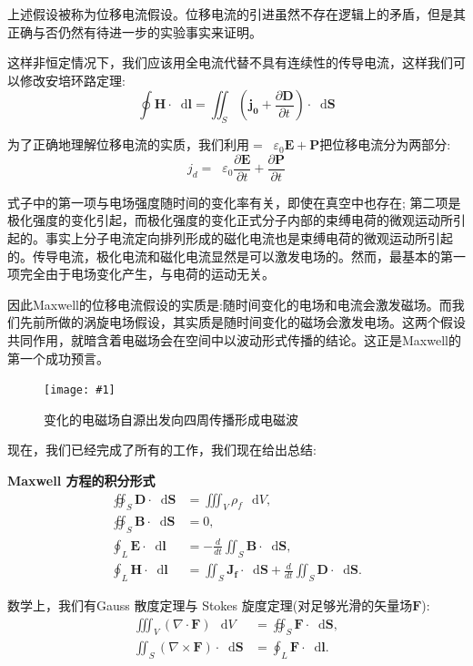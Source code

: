 \documentclass[12pt,a4paper,oneside]{report}
\theoremstyle{definition}
\theoremstyle{remark}
\newcommand{\insertfig}[3]{
    \begin{figure}[ht]
        \centering
        \texttt{[image: \#1]}
        \caption{#2}
        \label{fig:#1}
    \end{figure}
}
\newcommand{\mb}[1]{\mathbf{#1}}
\renewcommand{\d}{\mathop{}\!\mathrm{d}}
\renewcommand{\v}{\mathop{}\!\varepsilon}
\begin{document}
上述假设被称为位移电流假设。位移电流的引进虽然不存在逻辑上的矛盾，但是其正确与否仍然有待进一步的实验事实来证明。

这样非恒定情况下，我们应该用全电流代替不具有连续性的传导电流，这样我们可以修改安培环路定理:
\[
\oint \mb H \cdot \d \mb{l} = \iint_S (\mb{j_0}+\frac{\partial \mb{D}}{\partial t})\cdot \d \mb{S}
\]

为了正确地理解位移电流的实质，我们利用$\mb = \v_0 \mb{E} + \mb{P}$把位移电流分为两部分:
\[
j_d = \v_0 \frac{\partial \mb{E}}{\partial t}+\frac{\partial \mb{P}}{\partial t}
\]

式子中的第一项与电场强度随时间的变化率有关，即使在真空中也存在; 第二项是极化强度的变化引起，而极化强度的变化正式分子内部的束缚电荷的微观运动所引起的。事实上分子电流定向排列形成的磁化电流也是束缚电荷的微观运动所引起的。传导电流，极化电流和磁化电流显然是可以激发电场的。然而，最基本的第一项完全由于电场变化产生，与电荷的运动无关。

因此Maxwell的位移电流假设的实质是:随时间变化的电场和电流会激发磁场。而我们先前所做的涡旋电场假设，其实质是随时间变化的磁场会激发电场。这两个假设共同作用，就暗含着电磁场会在空间中以波动形式传播的结论。这正是Maxwell的第一个成功预言。

\insertfig{5-4.png}{变化的电磁场自源出发向四周传播形成电磁波}{0.25}

现在，我们已经完成了所有的工作，我们现在给出总结:

\textbf{Maxwell 方程的积分形式}
\begin{align*}
\oiint_{S} \mathbf{D}\cdot \d\mathbf{S} &= \iiint_{V} \rho_f\,\d V, \\[4pt]
\oiint_{S} \mathbf{B}\cdot \d\mathbf{S} &= 0, \\[4pt]
\oint_{L} \mathbf{E}\cdot \d\mathbf{l} &= -\frac{d}{dt}\iint_{S}\mathbf{B}\cdot \d\mathbf{S}, \\[4pt]
\oint_{L} \mathbf{H}\cdot \d\mathbf{l} &= \iint_{S}\mathbf{J_f}\cdot \d\mathbf{S}
+ \frac{d}{dt}\iint_{S}\mathbf{D}\cdot \d\mathbf{S}.
\end{align*}

数学上，我们有Gauss 散度定理与 Stokes 旋度定理(对足够光滑的矢量场$\mb{F}$):
\begin{align*}
\iiint_{V} (\nabla\cdot\mathbf{F})\,\d V &= \oiint_{S} \mathbf{F}\cdot \d\mathbf{S}, \\[4pt]
\iint_{S} (\nabla\times\mathbf{F})\cdot \d\mathbf{S} &= \oint_{L} \mathbf{F}\cdot \d\mathbf{l}.
\end{align*}
\end{document}
